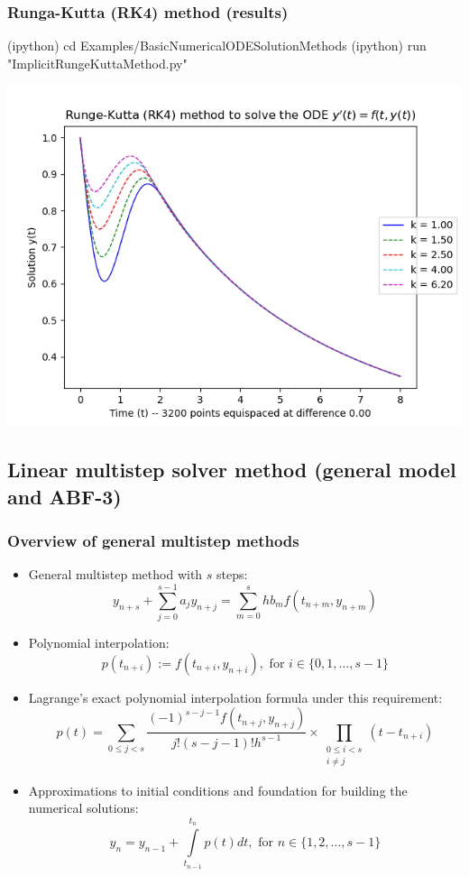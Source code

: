 \documentclass[usenames,svgnames,dvipsnames,10pt]{beamer}
\begin{document}
\begin{frame}[fragile]
\frametitle{Runga-Kutta (RK4) method (results)}

\begin{center}
\begin{code}
(ipython) cd Examples/BasicNumericalODESolutionMethods
(ipython) run "ImplicitRungeKuttaMethod.py"
\end{code}
\vskip -0.205cm
\includegraphics[height=0.76\textheight]{../Images/ImplicitRungeKuttaRK4RecursionFormula-PlotOutputs-v2.png}
\end{center}

\end{frame}

\subsection{Linear multistep solver method (general model and ABF-3)}

\begin{frame}
\frametitle{Overview of general multistep methods}

\begin{itemize} 

\item General multistep method with $s$ steps: 
      $$y_{n+s} + \sum\limits_{j=0}^{s-1} a_j y_{n+j} = \sum\limits_{m=0}^s hb_m f(t_{n+m}, y_{n+m})$$
\item Polynomial interpolation: 
      $$p(t_{n+i}) := f(t_{n+i}, y_{n+i}), \text{ for } i \in \{0,1,\ldots,s-1\}$$
\item Lagrange's exact polynomial interpolation formula under this requirement: 
      $$p(t) = \sum\limits_{0 \leq j < s} \frac{(-1)^{s-j-1} f(t_{n+j}, y_{n+j})}{j! (s-j-1)! h^{s-1}} \times 
       \prod\limits_{\substack{0 \leq i < s \\ i \neq j}} (t-t_{n+i})$$ 
\item Approximations to initial conditions and foundation for building the numerical solutions: 
      $$y_{n} = y_{n-1} + \int\limits_{t_{n-1}}^{t_{n}} p(t) dt, \text{ for } n \in \{1, 2, \ldots, s-1\}$$ 

\end{itemize} 

\end{frame}
\end{document}
